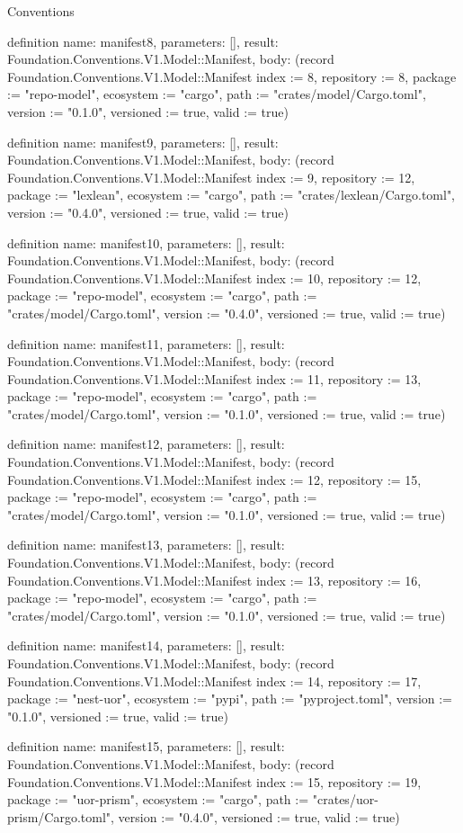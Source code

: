 \begin{lexlean}{Conventions}
\begin{semanticmodule}
definition{
  name: manifest8,
  parameters: [],
  result: Foundation.Conventions.V1.Model::Manifest,
  body: (record Foundation.Conventions.V1.Model::Manifest {index := 8, repository := 8, package := "repo-model", ecosystem := "cargo", path := "crates/model/Cargo.toml", version := "0.1.0", versioned := true, valid := true})
}

definition{
  name: manifest9,
  parameters: [],
  result: Foundation.Conventions.V1.Model::Manifest,
  body: (record Foundation.Conventions.V1.Model::Manifest {index := 9, repository := 12, package := "lexlean", ecosystem := "cargo", path := "crates/lexlean/Cargo.toml", version := "0.4.0", versioned := true, valid := true})
}

definition{
  name: manifest10,
  parameters: [],
  result: Foundation.Conventions.V1.Model::Manifest,
  body: (record Foundation.Conventions.V1.Model::Manifest {index := 10, repository := 12, package := "repo-model", ecosystem := "cargo", path := "crates/model/Cargo.toml", version := "0.4.0", versioned := true, valid := true})
}

definition{
  name: manifest11,
  parameters: [],
  result: Foundation.Conventions.V1.Model::Manifest,
  body: (record Foundation.Conventions.V1.Model::Manifest {index := 11, repository := 13, package := "repo-model", ecosystem := "cargo", path := "crates/model/Cargo.toml", version := "0.1.0", versioned := true, valid := true})
}

definition{
  name: manifest12,
  parameters: [],
  result: Foundation.Conventions.V1.Model::Manifest,
  body: (record Foundation.Conventions.V1.Model::Manifest {index := 12, repository := 15, package := "repo-model", ecosystem := "cargo", path := "crates/model/Cargo.toml", version := "0.1.0", versioned := true, valid := true})
}

definition{
  name: manifest13,
  parameters: [],
  result: Foundation.Conventions.V1.Model::Manifest,
  body: (record Foundation.Conventions.V1.Model::Manifest {index := 13, repository := 16, package := "repo-model", ecosystem := "cargo", path := "crates/model/Cargo.toml", version := "0.1.0", versioned := true, valid := true})
}

definition{
  name: manifest14,
  parameters: [],
  result: Foundation.Conventions.V1.Model::Manifest,
  body: (record Foundation.Conventions.V1.Model::Manifest {index := 14, repository := 17, package := "nest-uor", ecosystem := "pypi", path := "pyproject.toml", version := "0.1.0", versioned := true, valid := true})
}

definition{
  name: manifest15,
  parameters: [],
  result: Foundation.Conventions.V1.Model::Manifest,
  body: (record Foundation.Conventions.V1.Model::Manifest {index := 15, repository := 19, package := "uor-prism", ecosystem := "cargo", path := "crates/uor-prism/Cargo.toml", version := "0.4.0", versioned := true, valid := true})
}


\end{semanticmodule}
\end{lexlean}
